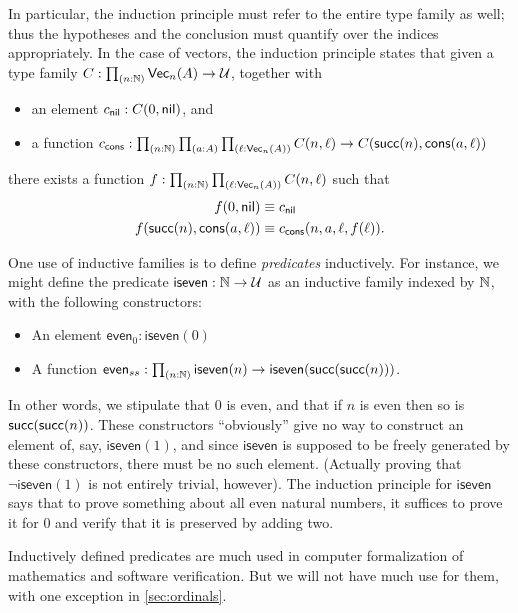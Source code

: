 In particular, the induction principle must refer to the entire type family as well; thus the hypotheses and the conclusion must quantify over the indices appropriately.
In the case of vectors, the induction principle states that given a type family $C:\prd{n:\nat} \vect n A \to \type$, together with
\begin{itemize}
\item an element $c_{\mathsf{nil}} : C(0,\mathsf{nil})$, and
\item a function $c_\cons : \prd{n:\nat}{a:A}{\ell:\vect n A} C(n,\ell) \to C(\suc(n),\cons(a,\ell))$
\end{itemize}
there exists a function $f:\prd{n:\nat}{\ell:\vect n A} C(n,\ell)$ such that
\begin{align*}
  f(0,\mathsf{nil}) &\equiv c_{\mathsf{nil}}\\
  f(\mathsf{succ}(n),\mathsf{cons}(a,\ell)) &\equiv c_{\mathsf{cons}}(n,a,\ell,f(\ell)).
\end{align*}

One use of inductive families is to define \emph{predicates} inductively.
For instance, we might define the predicate $\mathsf{iseven}:\mathbb{N}\to\mathcal{U}$ as an inductive family indexed by $\mathbb{N}$, with the following constructors:
\begin{itemize}
\item An element $\mathsf{even}_0 : \mathsf{iseven}(0)$
\item A function $\mathsf{even}_{ss} : \prd{n:\nat} \mathsf{iseven}(n) \to \mathsf{iseven}(\suc(\suc(n)))$.
\end{itemize}
In other words, we stipulate that $0$ is even, and that if $n$ is even then so is $\mathsf{succ}(\mathsf{succ}(n))$.
These constructors ``obviously'' give no way to construct an element of, say, $\mathsf{iseven}(1)$, and since $\mathsf{iseven}$ is supposed to be freely generated by these constructors, there must be no such element.
(Actually proving that $\neg \mathsf{iseven}(1)$ is not entirely trivial, however).
The induction principle for $\mathsf{iseven}$ says that to prove something about all even natural numbers, it suffices to prove it for $0$ and verify that it is preserved by adding two.

Inductively defined predicates are much used in computer formalization of mathematics and software verification.
But we will not have much use for them, with one exception in \autoref{sec:ordinals}.

